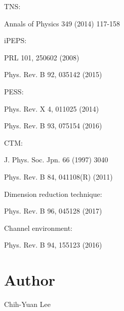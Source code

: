 \begin{DoxyItemize}
\item T\+NS\+:
\begin{DoxyItemize}
\item Annals of Physics 349 (2014) 117-\/158
\end{DoxyItemize}
\item i\+P\+E\+PS\+:
\begin{DoxyItemize}
\item P\+RL 101, 250602 (2008)
\item Phys. Rev. B 92, 035142 (2015)
\end{DoxyItemize}
\item P\+E\+SS\+:
\begin{DoxyItemize}
\item Phys. Rev. X 4, 011025 (2014)
\item Phys. Rev. B 93, 075154 (2016)
\end{DoxyItemize}
\item C\+TM\+:
\begin{DoxyItemize}
\item J. Phys. Soc. Jpn. 66 (1997) 3040
\item Phys. Rev. B 84, 041108(R) (2011)
\end{DoxyItemize}
\item Dimension reduction technique\+:
\begin{DoxyItemize}
\item Phys. Rev. B 96, 045128 (2017)
\end{DoxyItemize}
\item Channel environment\+:
\begin{DoxyItemize}
\item Phys. Rev. B 94, 155123 (2016)
\end{DoxyItemize}
\end{DoxyItemize}\hypertarget{index_Author}{}\section{Author}\label{index_Author}
Chih-\/\+Yuan Lee 